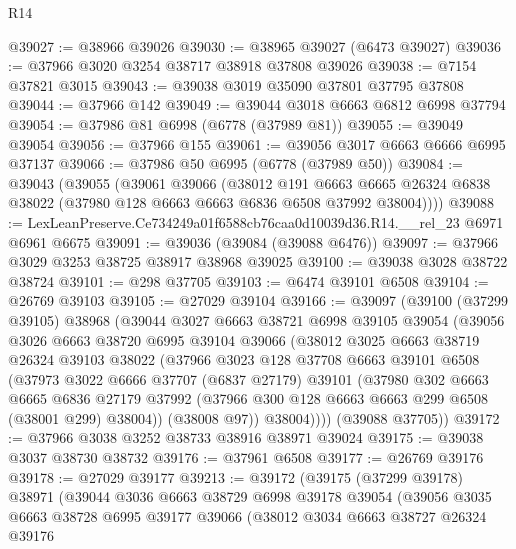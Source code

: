 \begin{lexlean}{R14}
\begin{coremodule}
@39027 := @38966 @39026
@39030 := @38965 @39027 (@6473 @39027)
@39036 := @37966 @3020 @3254 @38717 @38918 @37808 @39026
@39038 := @7154 @37821 @3015
@39043 := @39038 @3019 @35090 @37801 @37795 @37808
@39044 := @37966 @142
@39049 := @39044 @3018 @6663 @6812 @6998 @37794
@39054 := @37986 @81 @6998 (@6778 (@37989 @81))
@39055 := @39049 @39054
@39056 := @37966 @155
@39061 := @39056 @3017 @6663 @6666 @6995 @37137
@39066 := @37986 @50 @6995 (@6778 (@37989 @50))
@39084 := @39043
    (@39055
      (@39061
        @39066
        (@38012
          @191
          @6663
          @6665
          @26324
          @6838
          @38022
          (@37980 @128 @6663 @6663 @6836 @6508 @37992 @38004))))
@39088 := LexLeanPreserve.Ce734249a01f6588cb76caa0d10039d36.R14.__rel_23 @6971 @6961 @6675
@39091 := @39036 (@39084 (@39088 @6476))
@39097 := @37966 @3029 @3253 @38725 @38917 @38968 @39025
@39100 := @39038 @3028 @38722 @38724
@39101 := @298 @37705
@39103 := @6474 @39101 @6508
@39104 := @26769 @39103
@39105 := @27029 @39104
@39166 := @39097
    (@39100
      (@37299 @39105)
      @38968
      (@39044
        @3027
        @6663
        @38721
        @6998
        @39105
        @39054
        (@39056
          @3026
          @6663
          @38720
          @6995
          @39104
          @39066
          (@38012
            @3025
            @6663
            @38719
            @26324
            @39103
            @38022
            (@37966
              @3023
              @128
              @37708
              @6663
              @39101
              @6508
              (@37973
                @3022
                @6666
                @37707
                (@6837 @27179)
                @39101
                (@37980
                  @302
                  @6663
                  @6665
                  @6836
                  @27179
                  @37992
                  (@37966 @300 @128 @6663 @6663 @299 @6508 (@38001 @299) @38004))
                (@38008 @97))
              @38004))))
      (@39088 @37705))
@39172 := @37966 @3038 @3252 @38733 @38916 @38971 @39024
@39175 := @39038 @3037 @38730 @38732
@39176 := @37961 @6508
@39177 := @26769 @39176
@39178 := @27029 @39177
@39213 := @39172
    (@39175
      (@37299 @39178)
      @38971
      (@39044
        @3036
        @6663
        @38729
        @6998
        @39178
        @39054
        (@39056
          @3035
          @6663
          @38728
          @6995
          @39177
          @39066
          (@38012
            @3034
            @6663
            @38727
            @26324
            @39176

\end{coremodule}
\end{lexlean}
